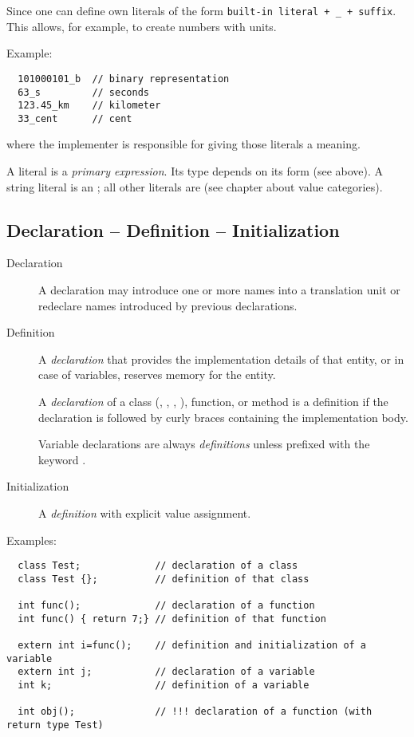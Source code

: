 \begin{rem}
  Since\marginpar{[\cxx11]}  one can define own literals of the form \texttt{built-in literal + \_ + suffix}. This allows, for example, to create numbers with units.

Example:
\begin{verbatim}
  101000101_b  // binary representation
  63_s         // seconds
  123.45_km    // kilometer
  33_cent      // cent
\end{verbatim}

where the implementer is responsible for giving those literals a meaning.
\end{rem}

\begin{rem}
  A literal is a \textit{primary expression}. Its type depends on its form (see above). A string literal is an ; all other literals are  (see chapter about value categories).
\end{rem}


\subsection{Declaration -- Definition -- Initialization}
\begin{description}
  \item[Declaration] A declaration may introduce one or more names into a translation unit or redeclare names introduced by previous declarations.

  \item[Definition] A \textit{declaration} that provides the implementation details of that entity, or in case of variables, reserves memory for the entity.

  A \textit{declaration} of a class (, , , ), function, or method is a definition if the declaration is followed by curly braces containing the implementation body.

  Variable declarations are always \textit{definitions} unless prefixed with the keyword .

  \item[Initialization] A \textit{definition} with explicit value assignment.
\end{description}

Examples:
\begin{verbatim}
  class Test;             // declaration of a class
  class Test {};          // definition of that class

  int func();             // declaration of a function
  int func() { return 7;} // definition of that function

  extern int i=func();    // definition and initialization of a variable
  extern int j;           // declaration of a variable
  int k;                  // definition of a variable

  int obj();              // !!! declaration of a function (with return type Test)
\end{verbatim}

